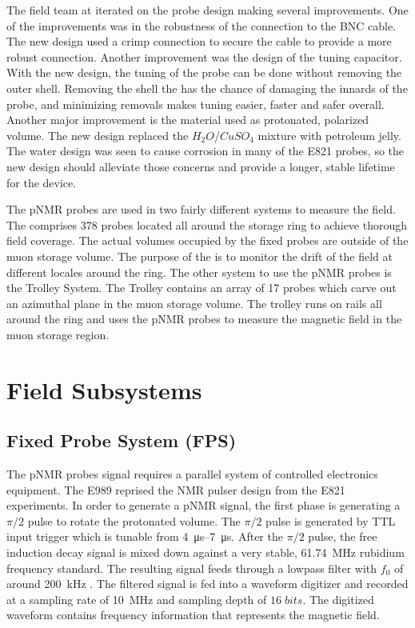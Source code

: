 The field team at \uw iterated on the probe design making several improvements.  One of the improvements was in the robustness of the connection to the BNC cable.  The new design used a crimp connection to secure the cable to provide a more robust connection.  Another improvement was the design of the tuning capacitor.  With the new design, the tuning of the probe can be done without removing the outer shell.  Removing the shell the has the chance of damaging the innards of the probe, and minimizing removals makes tuning easier, faster and safer overall.  Another major improvement is the material used as protonated, polarized volume.  The new design replaced the $H_2O$/$CuSO_4$ mixture with petroleum jelly.  The water design was seen to cause corrosion in many of the E821 probes, so the new design should alleviate those concerns and provide a longer, stable lifetime for the device.

The pNMR probes are used in two fairly different systems to measure the field.  The \fps comprises 378 probes located all around the storage ring to achieve thorough field coverage.  The actual volumes occupied by the fixed probes are outside of the muon storage volume.  The purpose of the \fps is to monitor the drift of the field at different locales around the ring.  The other system to use the pNMR probes is the Trolley System. The Trolley contains an array of 17 probes which carve out an azimuthal plane in the muon storage volume.  The trolley runs on rails all around the ring and uses the pNMR probes to measure the magnetic field in the muon storage region.  

\section{Field Subsystems}

\subsection{Fixed Probe System (FPS)}

The pNMR probes signal requires a parallel system of controlled electronics equipment.  The E989 reprised the NMR pulser design from the E821 experiments.  In order to generate a pNMR signal, the first phase is generating a $\pi/2$ pulse to rotate the protonated volume.  The $\pi/2$ pulse is generated by TTL input trigger which is tunable from \SIrange{4}{7}{\micro\second}.  After the $\pi/2$ pulse, the free induction decay signal is mixed down against a very stable, \SI{61.74}{\MHz} rubidium frequency standard.  The resulting signal feeds through a lowpass filter with $f_0$ of around \SI{200}{\kHz} .  The filtered signal is fed into a waveform digitizer and recorded at a sampling rate of \SI{10}{\MHz} and sampling depth of $16\;bits$.  The digitized waveform contains frequency information that represents the magnetic field.

